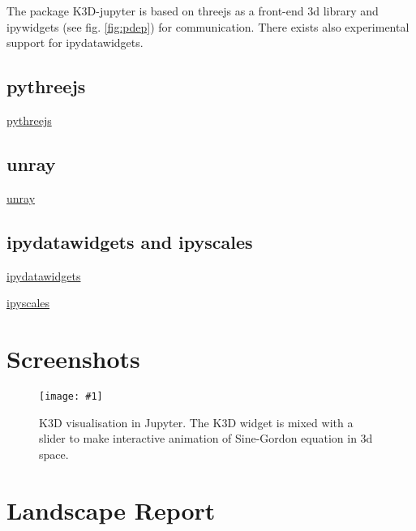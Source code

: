 \documentclass{deliverablereport}
\begin{document}
The package K3D-jupyter is based on threejs as a front-end 3d library
and ipywidgets (see fig. \ref{fig:pdep}) for communication.  There exists also
experimental support for ipydatawidgets. 



\subsection{pythreejs}

\href{https://github.com/jupyter-widgets/pythreejs}{pythreejs}

\subsection{unray}

\href{https://github.com/vidartf/unray}{unray}

\subsection{ipydatawidgets and ipyscales}

\href{https://github.com/vidartf/ipydatawidgets}{ipydatawidgets}

\href{https://github.com/vidartf/ipyscales}{ipyscales}




\appendix
\section{Screenshots}\label{screenshots}

\newcommand{\screenshot}[2]{
\begin{figure}[ht]
  \texttt{[image: \#1]}
  \caption{#2}
\end{figure}}


\screenshot{k3d_3.png}{K3D visualisation in Jupyter. The K3D widget is
  mixed with a slider to make interactive animation of Sine-Gordon
  equation in 3d space.}

\clearpage
\section{Landscape Report}\label{landscape}

\end{document}
